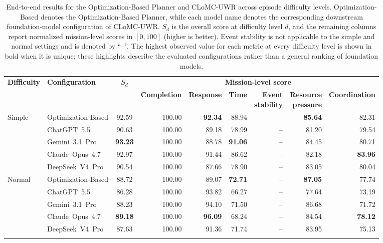 \begin{table}[!t]
    \centering
    \caption{End-to-end results for the Optimization-Based Planner and
    CLoMC-UWR across episode difficulty levels. Optimization-Based
    denotes the Optimization-Based Planner, while each model name denotes the
    corresponding downstream foundation-model configuration of CLoMC-UWR.
    $S_d$ is the overall score at difficulty level $d$, and the remaining columns report normalized mission-level scores in
    $[0,100]$ (higher is better). Event stability is not applicable to the
    simple and normal settings and is denoted by ``--''. The highest observed
    value for each metric at every difficulty level is shown in bold when it is
    unique; these highlights describe the evaluated configurations rather than
    a general ranking of foundation models.}
    \label{tab:main-results}
    \footnotesize
    \setlength{\tabcolsep}{1.5pt}
    \renewcommand{\arraystretch}{1.12}
    \begin{tabular*}{\textwidth}{@{\extracolsep{\fill}}llcrrrrrr@{}}
        \toprule
        \multirow{2}{*}{\textbf{Difficulty}}
        & \multirow{2}{*}{\textbf{Configuration}}
        & \multirow{2}{*}{\textbf{$S_d$}}
        & \multicolumn{6}{c}{\textbf{Mission-level score}} \\
        \cmidrule(l){4-9}
        & &
        & \textbf{Completion}
        & \textbf{Response}
        & \textbf{Time}
        & \makecell{\textbf{Event}\\\textbf{stability}}
        & \makecell{\textbf{Resource}\\\textbf{pressure}}
        & \textbf{Coordination} \\
        \midrule

        Simple & Optimization-Based
        & 92.59 & 100.00 & \textbf{92.34} & 88.94
        & -- & \textbf{85.64} & 82.31 \\
        & ChatGPT~5.5
        & 90.63 & 100.00 & 89.18 & 78.99
        & -- & 81.20 & 79.54 \\
        & Gemini~3.1~Pro
        & \textbf{93.23} & 100.00 & 88.78 & \textbf{91.06} & -- & 84.45 & 80.71 \\
        & Claude~Opus~4.7
        & 92.97 & 100.00 & 91.44 & 86.62 & -- & 82.18 & \textbf{83.96} \\
        & DeepSeek~V4~Pro
        & 90.54 & 100.00 & 87.66 & 78.90 & -- & 83.05 & 80.04 \\
        \addlinespace

        Normal & Optimization-Based
        & 88.72 & 100.00 & 89.07 & \textbf{72.71}
        & -- & \textbf{87.05} & 77.74 \\
        & ChatGPT~5.5
        & 86.28 & 100.00 & 93.82 & 66.27
        & -- & 77.64 & 73.19 \\
        & Gemini~3.1~Pro
        & 88.23 & 100.00 & 94.10 & 71.50 & -- & 86.68 & 71.72 \\
        & Claude~Opus~4.7
        & \textbf{89.18} & 100.00 & \textbf{96.09} & 68.24 & -- & 84.54 & \textbf{78.12} \\
        & DeepSeek~V4~Pro
        & 87.63 & 100.00 & 91.36 & 71.74 & -- & 83.95 & 75.13 \\
        \addlinespace


\end{tabular*}
\end{table}
